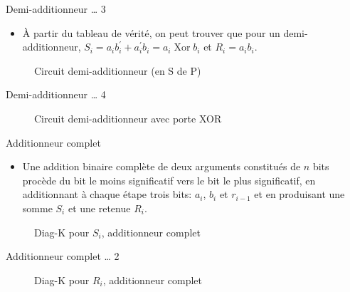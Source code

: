 \documentclass[presentation]{beamer}
\begin{document}
\begin{frame}[label={sec:orgcd34bb6}]{Demi-additionneur \ldots{} 3}
\begin{itemize}
\item À partir du tableau de vérité, on peut trouver que pour un demi-additionneur, \(S_{i} = a_i b_i^\prime + a_i^\prime b_i = a_i \operatorname{Xor} b_i\) et \(R_{i} = a_i b_i\).
\end{itemize}

\begin{figure}[htbp]
\centering

\caption{\label{fig:org29a633c}Circuit demi-additionneur (en S de P)}
\end{figure}
\end{frame}

\begin{frame}[label={sec:org0e7c0f7}]{Demi-additionneur \ldots{} 4}
\begin{figure}[htbp]
\centering

\caption{\label{fig:org29ef779}Circuit demi-additionneur avec porte XOR}
\end{figure}
\end{frame}

\begin{frame}[label={sec:orgb2eb6e3}]{Additionneur complet}
\begin{itemize}
\item Une addition binaire complète de deux arguments constitués de \(n\) bits procède du bit le moins significatif vers le bit le plus significatif, en additionnant à chaque étape trois bits: \(a_{i}\), \(b_{i}\) et \(r_{i-1}\) et en produisant une somme \(S_{i}\) et une retenue \(R_{i}\).
\end{itemize}


\begin{figure}[htbp]
\centering

\caption{\label{fig:org7636a0f}Diag-K pour \(S_i\), additionneur complet}
\end{figure}
\end{frame}

\begin{frame}[label={sec:org426a71a}]{Additionneur complet \ldots{} 2}
\begin{figure}[htbp]
\centering

\caption{\label{fig:orgb8f40a6}Diag-K pour \(R_i\), additionneur complet}
\end{figure}
\end{frame}
\end{document}
